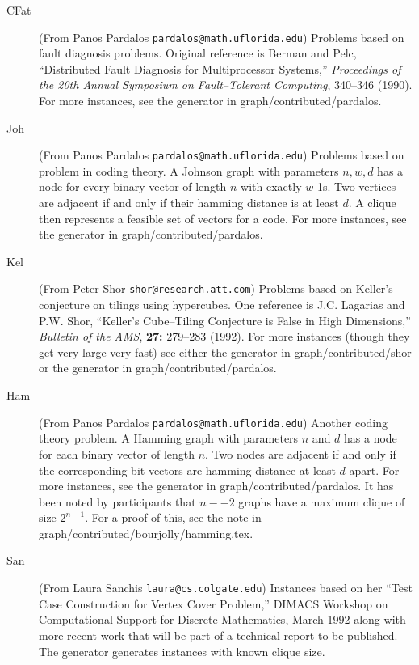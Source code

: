 \bigskip
{}

\begin{description}
\item[CFat] (From Panos Pardalos {\tt pardalos@math.uflorida.edu})
Problems based on fault diagnosis problems.  Original reference is
Berman and Pelc, ``Distributed Fault Diagnosis for Multiprocessor
Systems,'' {\it Proceedings of the 20th Annual Symposium on
Fault--Tolerant Computing}, 340--346 (1990).  For more instances, see
the generator in graph/contributed/pardalos.

\item[Joh] (From Panos Pardalos {\tt pardalos@math.uflorida.edu})
Problems based on problem in coding theory.  A Johnson graph with
parameters $n, w, d$ has a node for every binary vector of length $n$
with exactly $w$ 1s.  Two vertices are adjacent if and only if their
hamming distance is at least $d$.  A clique then represents a feasible
set of vectors for a code.  For more instances, see
the generator in graph/contributed/pardalos.

\item[Kel] (From Peter Shor {\tt shor@research.att.com}) Problems
based on Keller's conjecture on tilings using hypercubes.  One
reference is J.C. Lagarias and P.W. Shor, ``Keller's Cube--Tiling
Conjecture is False in High Dimensions,'' {\it Bulletin of the AMS},
{\bf 27:} 279--283 (1992). For more instances (though they get very
large very fast) see either the generator in graph/contributed/shor or
the generator in graph/contributed/pardalos.

\item[Ham] (From Panos Pardalos {\tt pardalos@math.uflorida.edu})
Another coding theory problem.  A Hamming graph with parameters $n$
and $d$ has a node for each binary vector of length $n$.  Two nodes
are adjacent if and only if the corresponding bit vectors are hamming
distance at least $d$ apart.  For more instances, see
the generator in graph/contributed/pardalos.  It has been noted by
participants that $n--2$ graphs have a maximum clique of size
$2^{n-1}$.  For a proof of this, see the note in
graph/contributed/bourjolly/hamming.tex. 

\item[San] (From Laura Sanchis {\tt laura@cs.colgate.edu}) Instances
based on her ``Test Case Construction for Vertex Cover Problem,''
DIMACS Workshop on Computational Support for Discrete Mathematics,
March 1992 along with more recent work that will be part of a
technical report to be published.  The generator generates instances
with known clique size.


\end{description}
